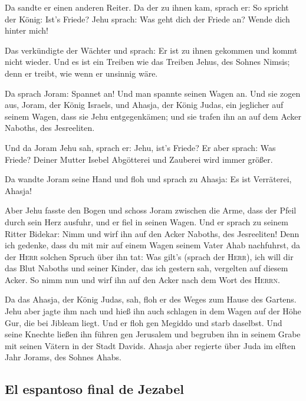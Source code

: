  Da sandte er einen anderen Reiter. Da der zu ihnen kam,
sprach er: So spricht der König: Ist's Friede? Jehu sprach: Was geht
dich der Friede an? Wende dich hinter mich!

 Das verkündigte der Wächter und sprach: Er ist zu ihnen
gekommen und kommt nicht wieder. Und es ist ein Treiben wie das Treiben
Jehus, des Sohnes Nimsis; denn er treibt, wie wenn er unsinnig wäre.

 Da sprach Joram: Spannet an! Und man spannte seinen
Wagen an. Und sie zogen aus, Joram, der König Israels, und Ahasja, der
König Judas, ein jeglicher auf seinem Wagen, dass sie Jehu
entgegenkämen; und sie trafen ihn an auf dem Acker Naboths, des
Jesreeliten.

 Und da Joram Jehu sah, sprach er: Jehu, ist's Friede? Er
aber sprach: Was Friede? Deiner Mutter Isebel Abgötterei und Zauberei
wird immer größer.

 Da wandte Joram seine Hand und floh und sprach zu
Ahasja: Es ist Verräterei, Ahasja!

 Aber Jehu fasste den Bogen und schoss Joram zwischen die
Arme, dass der Pfeil durch sein Herz ausfuhr, und er fiel in seinen
Wagen.  Und er sprach zu seinem Ritter Bidekar: Nimm und
wirf ihn auf den Acker Naboths, des Jesreeliten! Denn ich gedenke, dass
du mit mir auf einem Wagen seinem Vater Ahab nachfuhrst, da der
\textsc{Herr} solchen Spruch über ihn tat:  Was gilt's
(sprach der \textsc{Herr}), ich will dir das Blut Naboths und seiner
Kinder, das ich gestern sah, vergelten auf diesem Acker. So nimm nun und
wirf ihn auf den Acker nach dem Wort des \textsc{Herrn}.

 Da das Ahasja, der König Judas, sah, floh er des Weges
zum Hause des Gartens. Jehu aber jagte ihm nach und hieß ihn auch
schlagen in dem Wagen auf der Höhe Gur, die bei Jibleam liegt. Und er
floh gen Megiddo und starb daselbst.  Und seine Knechte
ließen ihn führen gen Jerusalem und begruben ihn in seinem Grabe mit
seinen Vätern in der Stadt Davids.  Ahasja aber regierte
über Juda im elften Jahr Jorams, des Sohnes Ahabs.

\hypertarget{el-espantoso-final-de-jezabel}{%
\subsection{El espantoso final de
Jezabel}\label{el-espantoso-final-de-jezabel}}

